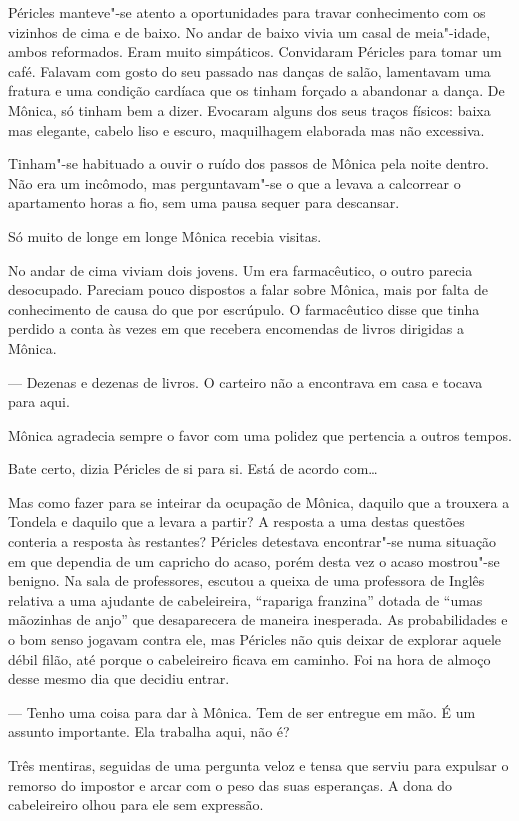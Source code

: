 Péricles manteve"-se atento a oportunidades para travar conhecimento com
os vizinhos de cima e de baixo. No andar de baixo vivia um casal de
meia"-idade, ambos reformados. Eram muito simpáticos. Convidaram Péricles
para tomar um café. Falavam com gosto do seu passado nas danças de
salão, lamentavam uma fratura e uma condição cardíaca que os tinham
forçado a abandonar a dança. De Mônica, só tinham bem a dizer. Evocaram
alguns dos seus traços físicos: baixa mas elegante, cabelo liso e
escuro, maquilhagem elaborada mas não excessiva.

Tinham"-se habituado a ouvir o ruído dos passos de Mônica pela noite
dentro. Não era um incômodo, mas perguntavam"-se o que a levava a
calcorrear o apartamento horas a fio, sem uma pausa sequer para
descansar.

Só muito de longe em longe Mônica recebia visitas.

No andar de cima viviam dois jovens. Um era farmacêutico, o outro
parecia desocupado. Pareciam pouco dispostos a falar sobre Mônica, mais
por falta de conhecimento de causa do que por escrúpulo. O farmacêutico
disse que tinha perdido a conta às vezes em que recebera encomendas de
livros dirigidas a Mônica.

--- Dezenas e dezenas de livros. O carteiro não a encontrava em casa e
tocava para aqui.

Mônica agradecia sempre o favor com uma polidez que pertencia a outros
tempos.

Bate certo, dizia Péricles de si para si. Está de acordo com\ldots{}

Mas como
fazer para se inteirar da ocupação de Mônica, daquilo que a trouxera a
Tondela e daquilo que a levara a partir? A resposta a uma destas
questões conteria a resposta às
restantes? Péricles detestava encontrar"-se numa situação em que dependia
de um capricho do acaso, porém desta vez o acaso mostrou"-se benigno. Na
sala de professores, escutou a queixa de uma professora de Inglês
relativa a uma ajudante de cabeleireira, ``rapariga franzina'' dotada de
``umas mãozinhas de anjo'' que desaparecera de maneira inesperada. As
probabilidades e o bom senso jogavam contra ele, mas Péricles não quis
deixar de explorar aquele débil filão, até porque o cabeleireiro
ficava em caminho. Foi na hora de almoço desse mesmo dia que decidiu
entrar.

--- Tenho uma coisa para dar à Mônica. Tem de ser entregue em mão. É um
  assunto importante. Ela trabalha aqui, não é?


Três mentiras, seguidas de uma pergunta veloz e tensa que serviu para
expulsar o remorso do impostor e arcar com o peso das suas esperanças. A
dona do cabeleireiro olhou para ele sem expressão.

